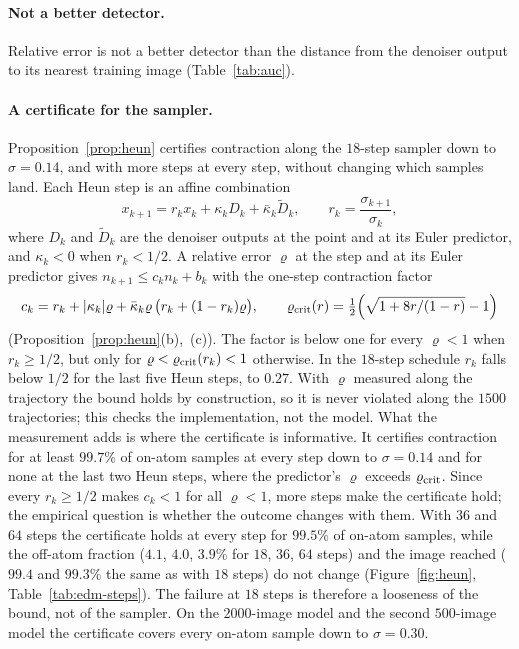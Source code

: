 \documentclass{article} %
\theoremstyle{plain}
\theoremstyle{definition}
\theoremstyle{remark}
\begin{document}
\paragraph{Not a better detector.} Relative error is not a better detector than the distance from
the denoiser output to its nearest training image (Table~\ref{tab:auc}).

\paragraph{A certificate for the sampler.} Proposition~\ref{prop:heun} certifies contraction along
the $18$-step sampler down to $\sigma=0.14$, and with more steps at every step, without changing which
samples land. Each Heun step is an affine combination
\begin{equation}
x_{k+1}=r_kx_k+\kappa_kD_k+\bar\kappa_k\tilde D_k,\qquad r_k=\frac{\sigma_{k+1}}{\sigma_k},
\label{eq:heun-step}
\end{equation}
where $D_k$ and $\tilde D_k$ are the denoiser outputs at the point and at its Euler predictor, and
$\kappa_k<0$ when $r_k<1/2$. A relative error $\varrho$ at the step and at its Euler predictor gives
$n_{k+1}\le c_kn_k+b_k$ with the one-step contraction factor
\begin{equation}
c_k=r_k+|\kappa_k|\varrho+\bar\kappa_k\varrho\,\bigl(r_k+(1-r_k)\varrho\bigr),\qquad
\varrho_{\rm crit}(r)=\tfrac12\Bigl(\sqrt{1+8r/(1-r)}-1\Bigr)
\label{eq:heun-factor}
\end{equation}
(Proposition~\ref{prop:heun}(b),~(c)). The factor is below one for every $\varrho<1$ when
$r_k\ge1/2$, but only for $\varrho<\varrho_{\rm crit}(r_k)<1$ otherwise. In the $18$-step schedule
$r_k$ falls below $1/2$ for the last five Heun steps, to $0.27$. With $\varrho$ measured along the
trajectory the bound holds by construction, so it is never violated along the $1500$ trajectories;
this checks the implementation, not the model. What the measurement adds is where the certificate
is informative. It certifies contraction for at least $99.7\%$ of on-atom samples at every step
down to $\sigma=0.14$ and for none at the last two Heun steps, where the predictor's $\varrho$
exceeds $\varrho_{\rm crit}$. Since every $r_k\ge1/2$ makes $c_k<1$ for all $\varrho<1$, more steps
make the certificate hold; the empirical question is whether the outcome changes with them. With
$36$ and $64$ steps the certificate holds at every step for $99.5\%$ of on-atom samples, while the
off-atom fraction ($4.1$, $4.0$, $3.9\%$ for $18$, $36$, $64$ steps) and the image reached ($99.4$
and $99.3\%$ the same as with $18$ steps) do not change (Figure~\ref{fig:heun},
Table~\ref{tab:edm-steps}). The failure at $18$ steps is therefore a looseness of the bound, not of
the sampler. On the $2000$-image model and the second $500$-image model the certificate covers every
on-atom sample down to $\sigma=0.30$.
\end{document}
